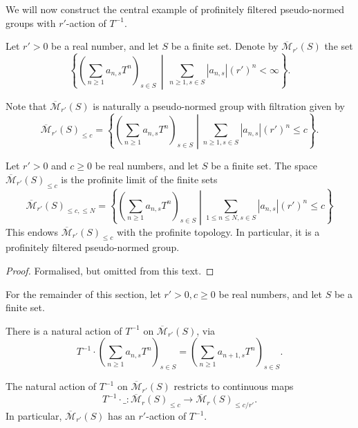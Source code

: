 We will now construct the central example of
profinitely filtered pseudo-normed groups with $r'$-action of $T^{-1}$.

\begin{definition}
  \label{Mbar}
  \leanok
  Let $r' > 0$ be a real number, and let $S$ be a finite set.
  Denote by $\overline{\mathcal M}_{r'}(S)$ the set
  \[
    \left\{ \left( \sum_{n \ge 1} a_{n,s} T^n \right)_{s \in S} \,\middle\vert\, \sum_{n \ge 1, s \in S} |a_{n,s}| (r')^n < \infty \right\}.
  \]

  Note that $\overline{\mathcal M}_{r'}(S)$ is naturally a pseudo-normed group
  with filtration given by
  \[
    \overline{\mathcal M}_{r'}(S)_{\le c} =
    \left\{ \left( \sum_{n \ge 1} a_{n,s} T^n \right)_{s \in S} \middle\vert \sum_{n \ge 1, s \in S} |a_{n,s}| (r')^n \le c \right\}.
  \]
\end{definition}

\begin{lemma}
  \label{Mbar_profinite_filtered}
  \leanok
  Let $r' > 0$ and $c \ge 0$ be real numbers, and let $S$ be a finite set.
  The space $\overline{\mathcal M}_{r'}(S)_{\le c}$ is the profinite limit of the finite sets
  \[
    \overline{\mathcal M}_{r'}(S)_{\le c, \le N} =
    \left\{ \left( \sum_{n \ge 1} a_{n,s} T^n \right)_{s \in S} \middle\vert
    \sum_{1 \le n \le N, s \in S} |a_{n,s}| (r')^n \le c \right\}
  \]
  This endows $\overline{\mathcal M}_{r'}(S)_{\le c}$ with the profinite topology.
  In particular, it is a profinitely filtered pseudo-normed group.
\end{lemma}

\begin{proof}
  \leanok
  Formalised, but omitted from this text.
\end{proof}

For the remainder of this section,
let $r' > 0, c \ge 0$ be real numbers,
and let $S$ be a finite set.

\begin{definition}
  \label{Mbar_Tinv}
  \leanok
  There is a natural action of $T^{-1}$ on $\overline{\mathcal M}_{r'}(S)$, via
  \[
    T^{-1} \cdot
    \left( \sum_{n \ge 1} a_{n,s} T^n \right)_{s \in S} =
    \left( \sum_{n \ge 1} a_{n+1,s} T^n \right)_{s \in S}.
  \]
\end{definition}

\begin{lemma}
  \label{Mbar_with_Tinv}
  \leanok
  The natural action of $T^{-1}$ on $\overline{\mathcal M}_{r'}(S)$
  restricts to continuous maps
  \[
    T^{-1} \cdot \_ \colon
    \overline{\mathcal M}_r(S)_{\le c} \to
    \overline{\mathcal M}_r(S)_{\le c/r'}.
  \]
  In particular, $\overline{\mathcal M}_{r'}(S)$
  has an $r'$-action of $T^{-1}$.
\end{lemma}


